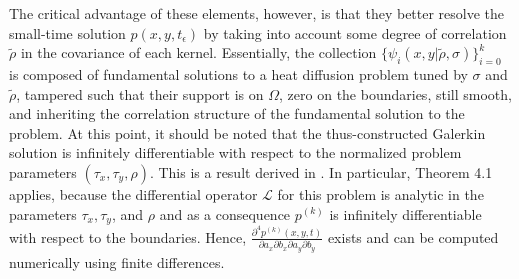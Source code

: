 \documentclass[10pt]{article}
\begin{document}
The critical advantage of these elements, however, is that they better
resolve the small-time solution $p(x,y,t_\epsilon)$ by taking into
account some degree of correlation $\tilde{\rho}$ in the covariance of
each kernel.  Essentially, the collection
$\{ \psi_i(x,y| \tilde{\rho}, \sigma) \}_{i=0}^k$ is
composed of fundamental solutions to a heat diffusion problem tuned by
$\sigma$ and $\tilde{\rho}$, tampered such that their support is on
$\Omega$, zero on the boundaries, still smooth, and inheriting the
correlation structure of the fundamental solution to the
problem. %
At this point, it should be noted that the thus-constructed Galerkin
solution is infinitely differentiable with respect to the normalized
problem parameters $(\tau_x, \tau_y, \rho)$. This is a result derived
in \cite{singler2008differentiability}. In particular, Theorem 4.1
applies, because the differential operator $\mathcal{L}$ for this
problem is analytic in the parameters $\tau_x, \tau_y$, and $\rho$ and
as a consequence $p^{(k)}$ is infinitely differentiable with respect
to the boundaries. Hence,
$\frac{\partial^4 p^{(k)}(x,y,t)}{\partial a_x \partial b_x \partial
  a_y \partial b_y}$ exists and can be computed numerically using
finite differences.
\end{document}
